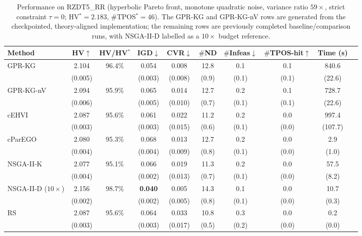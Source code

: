 \documentclass[12pt]{article}
\theoremstyle{plain}
\theoremstyle{definition}
\theoremstyle{remark}
\begin{document}
\begin{table}[t]
\centering
\caption{Performance on RZDT5\_RR (hyperbolic Pareto front, monotone
quadratic noise, variance ratio $59\times$, strict constraint
$\tau=0$; HV$^*=2.183$, $\#$TPOS$^*=46$).  The GPR-KG and GPR-KG-nV
rows are generated from the checkpointed, theory-aligned
implementation; the remaining rows are previously completed
baseline/comparison runs, with NSGA-II-D labelled as a $10\times$
budget reference.}
\label{tab:rzdt5rr}
\small
\setlength{\tabcolsep}{3.5pt}
\begin{tabular}{l cc ccc ccc c}
\toprule
Method & HV$\uparrow$ & HV/HV$^*$
       & IGD$\downarrow$ & CVR$\downarrow$
       & $\#$ND & $\#$Infeas$\downarrow$ & $\#$TPOS-hit$\uparrow$
       & Time (s) \\
\midrule
GPR-KG             & 2.104 & 96.4\% & 0.054 & 0.008
                   & 12.8 & 0.1 & 0.1 & 840.6 \\
                   & (0.005) & & (0.003) & (0.008)
                   & (0.9) & (0.1) & (0.1) & (22.6) \\[2pt]
GPR-KG-nV          & 2.094 & 95.9\% & 0.065 & 0.014
                   & 12.7 & 0.2 & 0.1 & 728.7 \\
                   & (0.006) & & (0.005) & (0.010)
                   & (0.7) & (0.1) & (0.1) & (22.6) \\[2pt]
cEHVI              & 2.087 & 95.6\% & 0.061 & 0.022
                   & 11.2 & 0.2 & 0.0 & 997.4 \\
                   & (0.003) & & (0.003) & (0.015)
                   & (0.6) & (0.1) & (0.0) & (107.7) \\[2pt]
cParEGO            & 2.080 & 95.3\% & 0.068 & 0.013
                   & 12.7 & 0.2 & 0.0 & 2.9 \\
                   & (0.004) & & (0.004) & (0.009)
                   & (0.8) & (0.1) & (0.0) & (1.0) \\[2pt]
NSGA-II-K          & 2.077 & 95.1\% & 0.066 & 0.019
                   & 11.3 & 0.2 & 0.0 & 57.5 \\
                   & (0.004) & & (0.002) & (0.013)
                   & (0.7) & (0.1) & (0.0) & (8.2) \\[2pt]
\midrule
NSGA-II-D ($10\times$)
                   & 2.156 & 98.7\% & \textbf{0.040} & 0.005
                   & 14.3 & 0.1 & 0.0 & 10.7 \\
                   & (0.002) & & (0.002) & (0.005)
                   & (0.8) & (0.1) & (0.0) & (0.3) \\[2pt]
\midrule
RS                 & 2.087 & 95.6\% & 0.064 & 0.033
                   & 10.8 & 0.3 & 0.0 & 0.2 \\
                   & (0.003) & & (0.003) & (0.017)
                   & (0.5) & (0.2) & (0.0) & (0.0) \\
\bottomrule
\end{tabular}
\end{table}
\end{document}
